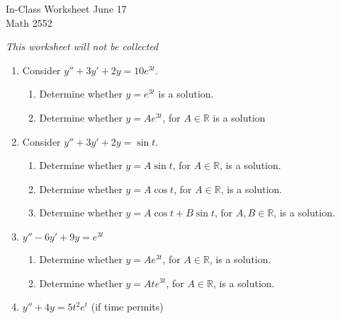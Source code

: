 \documentclass[12pt]{article}
\newcommand{\TestName}{In-Class Worksheet June 17}
\begin{document}
    
\vspace*{-.5cm}


\newcommand{\Course}{Math 2552}

\begin{center}
{\Large \TestName 
\\[4pt]
\Course}
\end{center}

\begin{center}    
{\small
\textit{This worksheet will not be collected}
}
\end{center}


\begin{enumerate}
    
       \item Consider $\displaystyle y'' +3y' +2y = 10e^{3t}$.
       \begin{enumerate}[label=(\Alph*)]
           \item Determine whether $y = e^{3t}$ is a solution.
           \item Determine whether $y = Ae^{3t}$, for $A\in \mathbb R$ is a solution
       \end{enumerate}
       \item Consider $\displaystyle y'' +3y' +2y = \sin t$.
       \begin{enumerate}[label=(\Alph*)]
           \item Determine whether $y = A\sin t$, for $A\in \mathbb R$, is a solution.
           \item Determine whether $y = A\cos t$, for $A\in \mathbb R$, is a solution.
           \item Determine whether $y = A\cos t + B\sin t$, for $A,B\in \mathbb R$, is a solution.
       \end{enumerate}       
       \item $\displaystyle y'' -6y' + 9y = e^{3t}$
       \begin{enumerate}[label=(\Alph*)]
           \item Determine whether $y = Ae^{3t}$, for $A\in \mathbb R$, is a solution.
           \item Determine whether $y = Ate^{3t}$, for $A\in \mathbb R$, is a solution.
       \end{enumerate}        
       \item $\displaystyle y'' +4 y = 5t^2 e^t$ (if time permits)
       
\end{enumerate}
\end{document}
